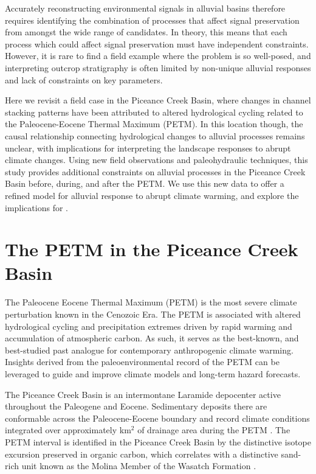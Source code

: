 \documentclass[draft]{compact_proposal}
\newcommand{\del}[3]{\ce{\delta^#1#2_{#3}}}
\begin{document}
Accurately reconstructing environmental signals in alluvial basins therefore requires identifying the combination of processes that affect signal preservation from amongst the wide range of candidates.
In theory, this means that each process which could affect signal preservation must have independent constraints.
However, it is rare to find a field example where the problem is so well-posed, and interpreting outcrop stratigraphy is often limited by non-unique alluvial responses and lack of constraints on key parameters.

Here we revisit a field case in the Piceance Creek Basin, where changes in channel stacking patterns have been attributed to altered hydrological cycling related to the Paleocene-Eocene Thermal Maximum (PETM).
In this location though, the causal relationship connecting hydrological changes to alluvial processes remains unclear, with implications for interpreting the landscape responses to abrupt climate changes.
Using new field observations and paleohydraulic techniques, this study provides additional constraints on alluvial processes in the Piceance Creek Basin before, during, and after the PETM.
We use this new data to offer a refined model for alluvial response to abrupt climate warming, and explore the implications for \pnote[something].

\section{The PETM in the Piceance Creek Basin}

The Paleocene Eocene Thermal Maximum (PETM) is the most severe climate perturbation known in the Cenozoic Era.
The PETM is associated with altered hydrological cycling and precipitation extremes driven by rapid warming and accumulation of atmospheric carbon.
As such, it serves as the best-known, and best-studied past analogue for contemporary anthropogenic climate warming.
Insights derived from the paleoenvironmental record of the PETM can be leveraged to guide and improve climate models and long-term hazard forecasts.

The Piceance Creek Basin is an intermontane Laramide depocenter active throughout the Paleogene and Eocene.
Sedimentary deposits there are conformable across the Paleocene-Eocene boundary and record climate conditions integrated over approximately  km$^2$ of drainage area during the PETM \cnote.
The PETM interval is identified in the Piceance Creek Basin by the distinctive \del{13}{C}{} isotope excursion preserved in organic carbon, which correlates with a distinctive sand-rich unit known as the Molina Member of the Wasatch Formation \cnote[bzf].
\end{document}
